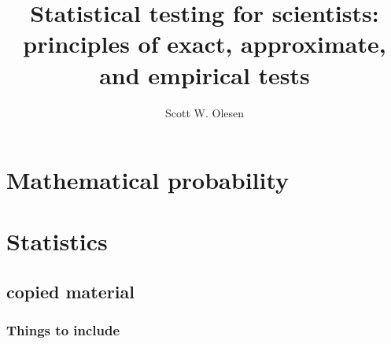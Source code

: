 \documentclass{book}
\title{Statistical testing for scientists: principles of exact, approximate, and empirical tests}
\author{Scott W. Olesen}
\begin{document}
\maketitle

\frontmatter



\mainmatter





\part{Mathematical probability}




\part{Statistics}






\chapter{copied material}

\section{Things to include}\label{things-to-include}
\end{document}
